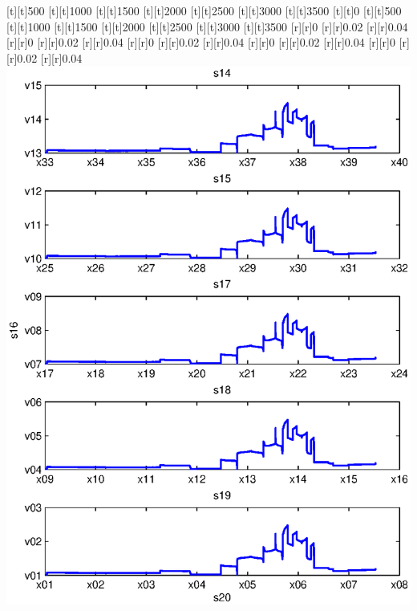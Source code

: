\begin{psfrags}
[t][t]{500}%
[t][t]{1000}%
[t][t]{1500}%
[t][t]{2000}%
[t][t]{2500}%
[t][t]{3000}%
[t][t]{3500}%
[t][t]{0}%
[t][t]{500}%
[t][t]{1000}%
[t][t]{1500}%
[t][t]{2000}%
[t][t]{2500}%
[t][t]{3000}%
[t][t]{3500}%
%
[r][r]{0}%
[r][r]{0.02}%
[r][r]{0.04}%
[r][r]{0}%
[r][r]{0.02}%
[r][r]{0.04}%
[r][r]{0}%
[r][r]{0.02}%
[r][r]{0.04}%
[r][r]{0}%
[r][r]{0.02}%
[r][r]{0.04}%
[r][r]{0}%
[r][r]{0.02}%
[r][r]{0.04}%
%
\includegraphics[width=15cm]{rmse_30_4.eps}%
\end{psfrags}%
%
